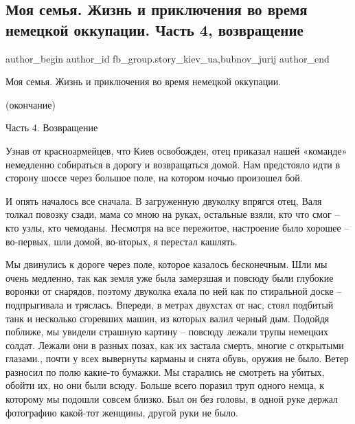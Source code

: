  
 
 
 
 
 
\subsection{Моя семья. Жизнь и приключения во время немецкой оккупации. Часть 4, возвращение}
\label{sec:06_11_2021.fb.fb_group.story_kiev_ua.2.okupacia_chast_4_vozvraschenie}
 
\ifcmt
 author_begin
   author_id fb_group.story_kiev_ua,bubnov_jurij
 author_end
\fi

Моя семья. Жизнь и приключения во время немецкой оккупации. 

(окончание)

Часть 4. Возвращение

Узнав от красноармейцев, что Киев освобожден, отец приказал нашей «команде»
немедленно собираться в дорогу и возвращаться домой. Нам предстояло идти в
сторону шоссе через большое поле, на котором ночью произошел бой.


И опять началось все сначала. В загруженную двуколку впрягся отец, Валя толкал
повозку сзади, мама со мною на руках, остальные взяли, кто что смог – кто узлы,
кто чемоданы. Несмотря на все пережитое, настроение было хорошее – во-первых,
шли домой, во-вторых, я перестал кашлять.

Мы двинулись к дороге через поле, которое казалось бесконечным. Шли мы очень
медленно, так как земля уже была замерзшая и повсюду были глубокие воронки от
снарядов, поэтому двуколка ехала по ней как по стиральной доске – подпрыгивала
и тряслась. Впереди, в метрах двухстах от нас, стоял подбитый танк и несколько
сгоревших машин, из которых валил черный дым. Подойдя поближе, мы увидели
страшную картину – повсюду лежали трупы немецких солдат. Лежали они в разных
позах, как их застала смерть, многие с открытыми глазами., почти у всех
вывернуты карманы и снята обувь, оружия не было. Ветер разносил по полю
какие-то бумажки. Мы старались не смотреть на убитых, обойти их, но они были
всюду. Больше всего поразил труп одного немца, к которому мы подошли совсем
близко. Был он без головы, в одной руке держал фотографию какой-тот женщины,
другой руки не было.

